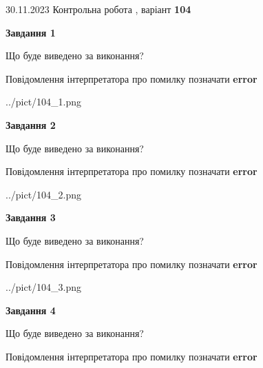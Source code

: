 \documentclass[12pt, ukrainian]{article}
\begin{document}
{{30.11.2023 Контрольна робота , варіант  \No \textbf { 104 }\par}}
{




{\begin {center}\textbf{Завдання 1}\end {center}}\par
Що буде виведено за виконання? \par
Повідомлення інтерпретатора про помилку позначати \textbf{error}

\begin{center}
	{../pict/104_1.png}
\end{center}
\newpage

{\begin {center}\textbf{Завдання 2}\end {center}}\par
Що буде виведено за виконання? \par
Повідомлення інтерпретатора про помилку позначати \textbf{error}

\begin{center}
	{../pict/104_2.png}
\end{center}
\newpage

{\begin {center}\textbf{Завдання 3}\end {center}}\par
Що буде виведено за виконання? \par
Повідомлення інтерпретатора про помилку позначати \textbf{error}

\begin{center}
	{../pict/104_3.png}
\end{center}
\newpage

{\begin {center}\textbf{Завдання 4}\end {center}}\par
Що буде виведено за виконання? \par
Повідомлення інтерпретатора про помилку позначати \textbf{error}

}
\end{document}
